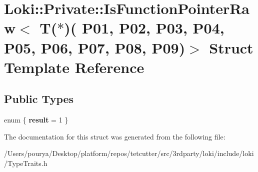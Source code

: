 \hypertarget{structLoki_1_1Private_1_1IsFunctionPointerRaw_3_01T_07_5_08_07_01_01_01_01_01_01_01_01_01_01_01_7f3498562d99a3852aa8ac338571cdd3}{}\section{Loki\+:\+:Private\+:\+:Is\+Function\+Pointer\+Raw$<$ T($\ast$)( P01, P02, P03, P04, P05, P06, P07, P08, P09)$>$ Struct Template Reference}
\label{structLoki_1_1Private_1_1IsFunctionPointerRaw_3_01T_07_5_08_07_01_01_01_01_01_01_01_01_01_01_01_7f3498562d99a3852aa8ac338571cdd3}
\subsection*{Public Types}
\begin{DoxyCompactItemize}
\item 
\hypertarget{structLoki_1_1Private_1_1IsFunctionPointerRaw_3_01T_07_5_08_07_01_01_01_01_01_01_01_01_01_01_01_7f3498562d99a3852aa8ac338571cdd3_a1a79726ca47cc11e5ec3e9ccc8a17d24}{}enum \{ {\bfseries result} = 1
 \}\label{structLoki_1_1Private_1_1IsFunctionPointerRaw_3_01T_07_5_08_07_01_01_01_01_01_01_01_01_01_01_01_7f3498562d99a3852aa8ac338571cdd3_a1a79726ca47cc11e5ec3e9ccc8a17d24}

\end{DoxyCompactItemize}


The documentation for this struct was generated from the following file\+:\begin{DoxyCompactItemize}
\item 
/\+Users/pourya/\+Desktop/platform/repos/tetcutter/src/3rdparty/loki/include/loki/Type\+Traits.\+h\end{DoxyCompactItemize}
